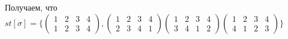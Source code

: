 \documentclass[a4paper,11pt]{article}
\begin{document}
Получаем, что $ st[\sigma] = \{
\begin{pmatrix}
1 & 2 & 3 & 4 \\
1 & 2 & 3 & 4
\end{pmatrix}, 
\begin{pmatrix}
1 & 2 & 3 & 4 \\
2 & 3 & 4 & 1
\end{pmatrix}
\begin{pmatrix}
1 & 2 & 3 & 4 \\
3 & 4 & 1 & 2
\end{pmatrix}
\begin{pmatrix}
1 & 2 & 3 & 4 \\
4 & 1 & 2 & 3
\end{pmatrix}
\} $
\\ \\ \\





\end{document}
